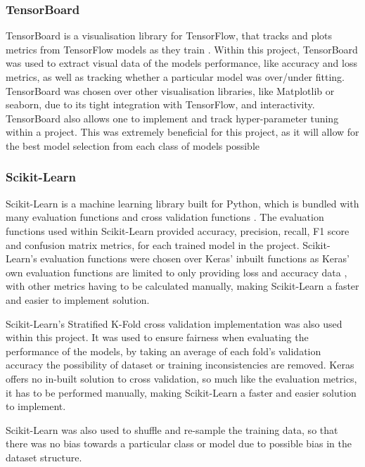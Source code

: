 \subsubsection{TensorBoard}
TensorBoard is a visualisation library for TensorFlow, that tracks and plots metrics from TensorFlow models as they train \citep{TensorBo28:online}. Within this project, TensorBoard was used to extract visual data of the models performance, like accuracy and loss metrics, as well as tracking whether a particular model was over/under fitting. TensorBoard was chosen over other visualisation libraries, like Matplotlib or seaborn, due to its tight integration with TensorFlow, and interactivity. TensorBoard also allows one to implement and track hyper-parameter tuning within a project. This was extremely beneficial for this project, as it will allow for the best model selection from each class of models possible

\subsubsection{Scikit-Learn}
Scikit-Learn is a machine learning library built for Python, which is bundled with many evaluation functions \citep{33Metric9:online} and cross validation functions \citep{31Crossv34:online}. The evaluation functions used within Scikit-Learn provided accuracy, precision, recall, F1 score and confusion matrix metrics, for each trained model in the project. Scikit-Learn's evaluation functions were chosen over Keras' inbuilt functions as Keras' own evaluation functions are limited to only providing loss and accuracy data \citep{Modeltra48:online}, with other metrics having to be calculated manually, making Scikit-Learn a faster and easier to implement solution. 

Scikit-Learn's Stratified K-Fold \citep{sklearnm1:online} cross validation implementation was also used within this project. It was used to ensure fairness when evaluating the performance of the models, by taking an average of each fold's validation accuracy the possibility of dataset or training inconsistencies are removed. Keras offers no in-built solution to cross validation, so much like the evaluation metrics, it has to be performed manually, making Scikit-Learn a faster and easier solution to implement.

Scikit-Learn was also used to shuffle and re-sample the training data, so that there was no bias towards a particular class or model due to possible bias in the dataset structure.

